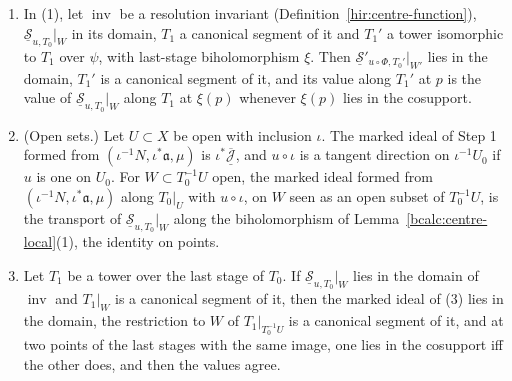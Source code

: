 \begin{theorem}
\begin{enumerate}
(Definition~\ref{hir:tower-isomorphism}) with last-stage biholomorphism \(\chi_0\), let \(W'\), \(W\) be open sets of the two last stages and \(\psi\colon W'\to W\) a
biholomorphism with \(\psi=\chi_0\) on \(W'\). Then \(\underline{\mathcal S}'_{u\circ\Phi,T_0'}|_{W'}=\psi^*\bigl(\underline{\mathcal S}_{u,T_0}|_W\bigr)\), where
\(\underline{\mathcal S}'\) is formed from \((\Phi^{-1}N,\Phi^*\mathfrak a,\mu)\). For \(\Phi=\mathrm{id}\) this reads
\(\underline{\mathcal S}_{u,T_0'}|_{W'}=\psi^*\bigl(\underline{\mathcal S}_{u,T_0}|_W\bigr)\).
\item In (1), let \(\operatorname{inv}\) be a resolution invariant (Definition~\ref{hir:centre-function}), \(\underline{\mathcal S}_{u,T_0}|_W\) in its domain, \(T_1\) a canonical
segment of it and \(T_1'\) a tower isomorphic to \(T_1\) over \(\psi\), with last-stage biholomorphism \(\xi\). Then \(\underline{\mathcal S}'_{u\circ\Phi,T_0'}|_{W'}\) lies
in the domain, \(T_1'\) is a canonical segment of it, and its value along \(T_1'\) at \(p\) is the value of \(\underline{\mathcal S}_{u,T_0}|_W\) along \(T_1\) at
\(\xi(p)\) whenever \(\xi(p)\) lies in the cosupport.
\item (Open sets.) Let \(U\subset X\) be open with inclusion \(\iota\). The marked ideal of Step 1 formed from \((\iota^{-1}N,\iota^*\mathfrak a,\mu)\) is
\(\iota^*\overline{\underline{\mathcal J}}\), and \(u\circ\iota\) is a tangent direction on \(\iota^{-1}U_0\) if \(u\) is one on \(U_0\). For \(W\subset T_0^{-1}U\) open, the
marked ideal formed from \((\iota^{-1}N,\iota^*\mathfrak a,\mu)\) along \(T_0|_U\) with \(u\circ\iota\), on \(W\) seen as an open subset of \(T_0^{-1}U\), is the transport of
\(\underline{\mathcal S}_{u,T_0}|_W\) along the biholomorphism of Lemma~\ref{bcalc:centre-local}(1), the identity on points.
\item Let \(T_1\) be a tower over the last stage of \(T_0\). If \(\underline{\mathcal S}_{u,T_0}|_W\) lies in the domain of \(\operatorname{inv}\) and \(T_1|_W\) is a canonical
segment of it, then the marked ideal of (3) lies in the domain, the restriction to \(W\) of \(T_1|_{T_0^{-1}U}\) is a canonical segment of it, and at two points of the
last stages with the same image, one lies in the cosupport iff the other does, and then the values agree.
\end{enumerate}
\end{theorem}
